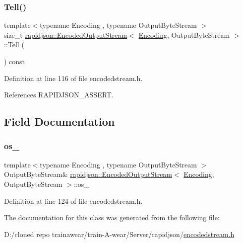 \subsubsection{\texorpdfstring{Tell()}{Tell()}}
{\footnotesize\ttfamily template$<$typename Encoding , typename Output\+Byte\+Stream $>$ \\
size\+\_\+t \mbox{\hyperlink{classrapidjson_1_1_encoded_output_stream}{rapidjson\+::\+Encoded\+Output\+Stream}}$<$ \mbox{\hyperlink{classrapidjson_1_1_encoding}{Encoding}}, Output\+Byte\+Stream $>$\+::Tell (\begin{DoxyParamCaption}{ }\end{DoxyParamCaption}) const}



Definition at line 116 of file encodedstream.\+h.


\begin{DoxyCode}{0}

\end{DoxyCode}


References R\+A\+P\+I\+D\+J\+S\+O\+N\+\_\+\+A\+S\+S\+E\+RT.



\subsection{Field Documentation}
\mbox{\label{classrapidjson_1_1_encoded_output_stream_a2710097be452d475b96538a16b7fa80a}} 
\subsubsection{\texorpdfstring{os\_}{os\_}}
{\footnotesize\ttfamily template$<$typename Encoding , typename Output\+Byte\+Stream $>$ \\
Output\+Byte\+Stream\& \mbox{\hyperlink{classrapidjson_1_1_encoded_output_stream}{rapidjson\+::\+Encoded\+Output\+Stream}}$<$ \mbox{\hyperlink{classrapidjson_1_1_encoding}{Encoding}}, Output\+Byte\+Stream $>$\+::os\+\_\+\hspace{0.3cm}{\ttfamily [private]}}



Definition at line 124 of file encodedstream.\+h.



The documentation for this class was generated from the following file\+:\begin{DoxyCompactItemize}
\item 
D\+:/cloned repo trainawear/train-\/\+A-\/wear/\+Server/rapidjson/\mbox{\hyperlink{encodedstream_8h}{encodedstream.\+h}}\end{DoxyCompactItemize}
